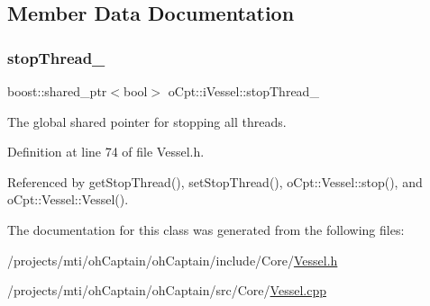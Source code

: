 \subsection{Member Data Documentation}
\hypertarget{classo_cpt_1_1i_vessel_a9f52bb65db31b6eea42e29a6213dd78a}{}\label{classo_cpt_1_1i_vessel_a9f52bb65db31b6eea42e29a6213dd78a} 
\subsubsection{\texorpdfstring{stop\+Thread\+\_\+}{stopThread\_}}
{\footnotesize\ttfamily boost\+::shared\+\_\+ptr$<$bool$>$ o\+Cpt\+::i\+Vessel\+::stop\+Thread\+\_\+\hspace{0.3cm}{\ttfamily [protected]}}



The global shared pointer for stopping all threads. 



Definition at line 74 of file Vessel.\+h.



Referenced by get\+Stop\+Thread(), set\+Stop\+Thread(), o\+Cpt\+::\+Vessel\+::stop(), and o\+Cpt\+::\+Vessel\+::\+Vessel().



The documentation for this class was generated from the following files\+:\begin{DoxyCompactItemize}
\item 
/projects/mti/oh\+Captain/oh\+Captain/include/\+Core/\hyperlink{_vessel_8h}{Vessel.\+h}\item 
/projects/mti/oh\+Captain/oh\+Captain/src/\+Core/\hyperlink{_vessel_8cpp}{Vessel.\+cpp}\end{DoxyCompactItemize}
